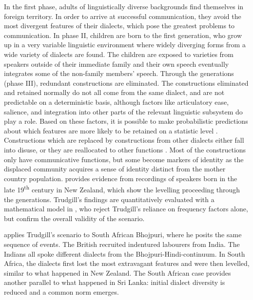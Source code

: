 In the first phase, adults of linguistically diverse backgrounds find themselves in foreign territory. In order to arrive at successful communication, they avoid the most divergent features of their dialects, which pose the greatest problems to communication. In phase II, children are born to the first generation, who grow up in a very variable linguistic environment where widely diverging forms from a wide variety of dialects are found. The children are exposed to varieties from speakers outside of their immediate family and their own speech eventually integrates some of the non-family members' speech. Through the generations (phase III), redundant constructions are eliminated. The constructions eliminated and retained normally do not all come from the same dialect, and are not predictable on a deterministic basis, although factors like articulatory ease, salience, and integration into other parts of the relevant linguistic subsystem do play a role. Based on these factors, it is possible to make probabilistic predictions about which features are more likely to be retained on a statistic level \citep{Trudgill2004}. Constructions which are replaced by constructions from other dialects either fall into disuse, or they are reallocated to other functions \citep{Trudgill1986}. Most of the constructions only have communicative functions, but some become markers of identity \citep{LePageEtAl1985} as the displaced community acquires a sense of identity distinct from the mother country population.  \citet{Trudgill2004} provides evidence from recordings of speakers born in the late 19\textsuperscript{th} century in New Zealand, which show the levelling proceeding through the generations.  Trudgill's findings are quantitatively evaluated with a mathematical model in \citet{BaxterEtAl2009trudg}, who reject Trudgill's reliance on frequency factors alone, but confirm the overall validity of the scenario.


\citet{Mesthrie1993} applies Trudgill's scenario to South African Bhojpuri, where he posits the same sequence of events. The British recruited indentured labourers from India. The Indians all spoke different dialects from the Bhojpuri-Hindi-continuum. In South Africa, the dialects first lost the most extravagant features and were then levelled, similar to what happened in New Zealand. The South African case provides another parallel to what happened in Sri Lanka: initial dialect diversity is reduced and a common norm emerges.



